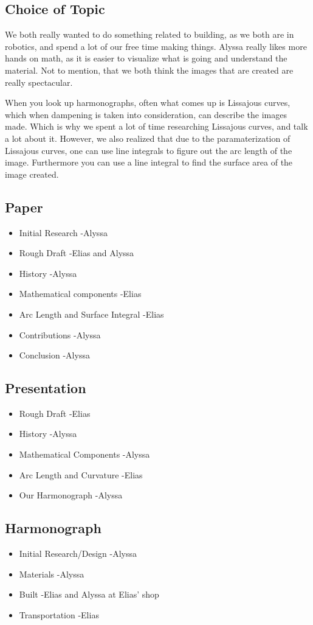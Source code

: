 \subsection{Choice of Topic}
We both really wanted to do something related to building, as we both are in robotics, and spend a lot of our free time making things. Alyssa really likes more hands on math, as it is easier to visualize what is going and understand the material. Not to mention, that we both think the images that are created are really spectacular.

When you look up harmonographs, often what comes up is Lissajous curves, which when dampening is taken into consideration, can describe the images made. Which is why we spent a lot of time researching Lissajous curves, and talk a lot about it. However, we also realized that due to the paramaterization of Lissajous curves, one can use line integrals to figure out the arc length of the image. Furthermore you can use a line integral to find the surface area of the image created.

\subsection{Paper}
\begin{itemize}
\item Initial Research -Alyssa
\item Rough Draft -Elias and Alyssa
\item History -Alyssa
\item Mathematical components -Elias
\item Arc Length and Surface Integral -Elias
\item Contributions -Alyssa
\item Conclusion -Alyssa
\end{itemize}
\subsection{Presentation}
\begin{itemize}
\item Rough Draft -Elias
\item History -Alyssa
\item Mathematical Components -Alyssa
\item Arc Length and Curvature -Elias
\item Our Harmonograph -Alyssa
\end{itemize}
\subsection{Harmonograph}
\begin{itemize}
\item Initial Research/Design -Alyssa
\item Materials -Alyssa
\item Built -Elias and Alyssa at Elias' shop
\item Transportation -Elias
\end{itemize}

